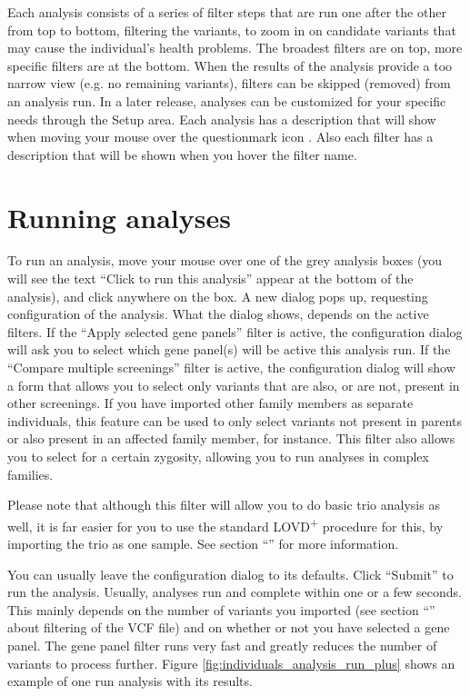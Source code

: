 Each analysis consists of a series of filter steps that are run one after the other from top to bottom,
 filtering the variants, to zoom in on candidate variants that may cause the individual's health problems.
The broadest filters are on top, more specific filters are at the bottom.
When the results of the analysis provide a too narrow view (e.g. no remaining variants),
 filters can be skipped (removed) from an analysis run.
In a later release, analyses can be customized for your specific needs through the Setup area.
Each analysis has a description that will show when moving your mouse over the questionmark icon .
Also each filter has a description that will be shown when you hover the filter name.





\section{Running analyses}
\label{sec:running_analyses_running}
To run an analysis, move your mouse over one of the grey analysis boxes (you will see the text
 ``Click to run this analysis'' appear at the bottom of the analysis), and click anywhere on the box.
A new dialog pops up, requesting configuration of the analysis.
What the dialog shows, depends on the active filters.
If the ``Apply selected gene panels'' filter is active,
 the configuration dialog will ask you to select which gene panel(s) will be active this analysis run.
If the ``Compare multiple screenings'' filter is active, the configuration dialog will show a form that allows
 you to select only variants that are also, or are not, present in other screenings.
If you have imported other family members as separate individuals, this feature can be used to only select variants not
 present in parents or also present in an affected family member, for instance.
This filter also allows you to select for a certain zygosity, allowing you to run analyses in complex families.

\begin{infotable}
Please note that although this filter will allow you to do basic trio analysis as well, it is far easier
 for you to use the standard LOVD\textsuperscript{+} procedure for this, by importing the trio as one sample.
See section ``'' for more information.
\end{infotable}

\noindent
You can usually leave the configuration dialog to its defaults.
Click ``Submit'' to run the analysis.
Usually, analyses run and complete within one or a few seconds.
This mainly depends on the number of variants you imported (see section ``''
 about filtering of the VCF file) and on whether or not you have selected a gene panel.
The gene panel filter runs very fast and greatly reduces the number of variants to process further.
Figure \ref{fig:individuals_analysis_run_plus} shows an example of one run analysis with its results.

